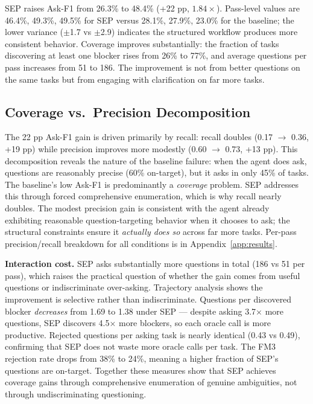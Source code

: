 \documentclass{article} %
\newcommand{\oursystem}{SEP} %
\begin{document}
\oursystem{} raises Ask-F1 from 26.3\% to 48.4\% (+22 pp, $1.84\times$).
Pass-level values are 46.4\%, 49.3\%, 49.5\% for \oursystem{} versus 28.1\%, 27.9\%,
23.0\% for the baseline; the lower variance ($\pm$1.7 vs $\pm$2.9) indicates the
structured workflow produces more consistent behavior.
Coverage improves substantially: the fraction of tasks discovering at least one blocker
rises from 26\% to 77\%, and average questions per pass increases from 51 to 186.
The improvement is not from better questions on the same tasks but from engaging with
clarification on far more tasks.

\subsection{Coverage vs.\ Precision Decomposition}

The 22 pp Ask-F1 gain is driven primarily by recall: recall doubles (0.17 $\to$ 0.36,
+19 pp) while precision improves more modestly (0.60 $\to$ 0.73, +13 pp).
This decomposition reveals the nature of the baseline failure: when the agent does ask,
questions are reasonably precise (60\% on-target), but it asks in only 45\% of tasks.
The baseline's low Ask-F1 is predominantly a \emph{coverage} problem.
\oursystem{} addresses this through forced comprehensive enumeration, which is why
recall nearly doubles.
The modest precision gain is consistent with the agent already exhibiting reasonable
question-targeting behavior when it chooses to ask; the structural constraints ensure
it \emph{actually does so} across far more tasks.
Per-pass precision/recall breakdown for all conditions is in Appendix~\ref{app:results}.

\textbf{Interaction cost.}
\oursystem{} asks substantially more questions in total (186 vs 51 per pass), which
raises the practical question of whether the gain comes from useful questions or
indiscriminate over-asking.
Trajectory analysis shows the improvement is selective rather than indiscriminate.
Questions per discovered blocker \emph{decreases} from 1.69 to 1.38 under \oursystem{} ---
despite asking 3.7$\times$ more questions, \oursystem{} discovers 4.5$\times$ more blockers,
so each oracle call is more productive.
Rejected questions per asking task is nearly identical (0.43 vs 0.49), confirming
that \oursystem{} does not waste more oracle calls per task.
The FM3 rejection rate drops from 38\% to 24\%, meaning a higher fraction of
\oursystem{}'s questions are on-target.
Together these measures show that \oursystem{} achieves coverage gains through
comprehensive enumeration of genuine ambiguities, not through undiscriminating questioning.
\end{document}
